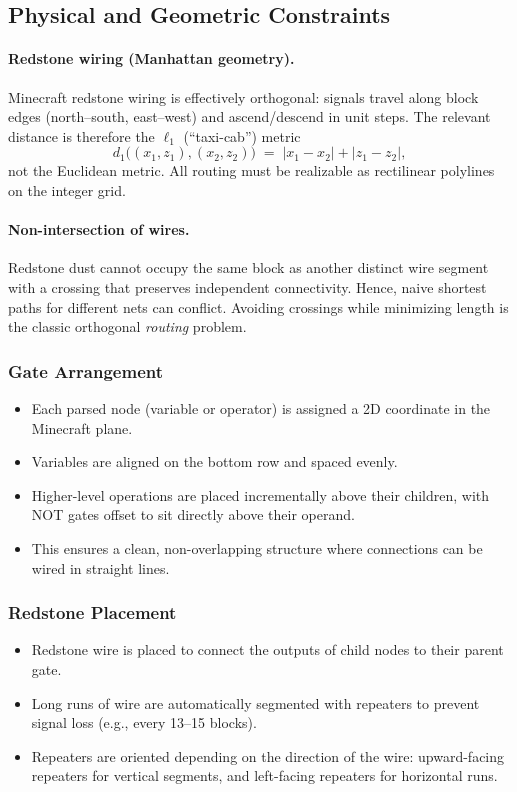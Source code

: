 \documentclass[11pt]{diazessay} %
\begin{document}
\begin{itemize}
\subsection{Physical and Geometric Constraints}

\paragraph{Redstone wiring (Manhattan geometry).}
Minecraft redstone wiring is effectively orthogonal: signals travel along block
edges (north--south, east--west) and ascend/descend in unit steps. The relevant
distance is therefore the $\ell_1$ (``taxi-cab'') metric
\[
d_1\big((x_1,z_1),(x_2,z_2)\big) \;=\; |x_1-x_2| + |z_1-z_2|,
\]
not the Euclidean metric. All routing must be realizable as rectilinear
polylines on the integer grid.

\paragraph{Non-intersection of wires.}
Redstone dust cannot occupy the same block as another distinct wire segment
with a crossing that preserves independent connectivity. Hence, naive shortest
paths for different nets can conflict. Avoiding crossings while minimizing
length is the classic orthogonal \emph{routing} problem.



\subsubsection*{Gate Arrangement}
\begin{itemize}
    \item Each parsed node (variable or operator) is assigned a
    2D coordinate in the Minecraft plane.
    \item Variables are aligned on the bottom row and spaced evenly.
    \item Higher-level operations are placed incrementally above their
    children, with NOT gates offset to sit directly above their operand.
    \item This ensures a clean, non-overlapping structure where
    connections can be wired in straight lines.
\end{itemize}

\subsubsection*{Redstone Placement}
\begin{itemize}
    \item Redstone wire is placed to connect the outputs of child nodes
    to their parent gate.
    \item Long runs of wire are automatically segmented with repeaters
    to prevent signal loss (e.g., every 13–15 blocks).
    \item Repeaters are oriented depending on the direction of the wire:
    upward-facing repeaters for vertical segments, and left-facing
    repeaters for horizontal runs.
\end{itemize}


\end{itemize}
\end{document}

